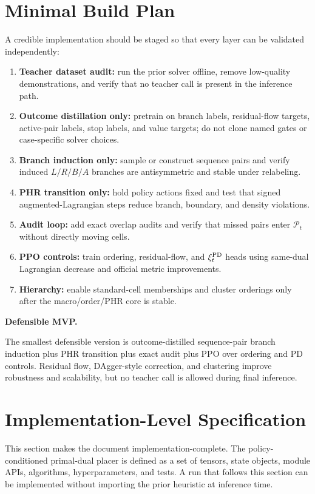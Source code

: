 \documentclass[11pt]{article}
\newcommand{\Pset}{\mathcal{P}}
\newcommand{\callout}[3]{%
\medskip\noindent\textbf{\textcolor{#1}{#2.}}\par\noindent #3\par\medskip
}
\begin{document}
\section{Minimal Build Plan}

A credible implementation should be staged so that every layer can be validated independently:
\begin{enumerate}
    \item \textbf{Teacher dataset audit:} run the prior solver offline, remove low-quality demonstrations, and verify that no teacher call is present in the inference path.
    \item \textbf{Outcome distillation only:} pretrain on branch labels, residual-flow targets, active-pair labels, stop labels, and value targets; do not clone named gates or case-specific solver choices.
    \item \textbf{Branch induction only:} sample or construct sequence pairs and verify induced $L/R/B/A$ branches are antisymmetric and stable under relabeling.
    \item \textbf{PHR transition only:} hold policy actions fixed and test that signed augmented-Lagrangian steps reduce branch, boundary, and density violations.
    \item \textbf{Audit loop:} add exact overlap audits and verify that missed pairs enter $\Pset_t$ without directly moving cells.
    \item \textbf{PPO controls:} train ordering, residual-flow, and $\xi_t^{\rm PD}$ heads using same-dual Lagrangian decrease and official metric improvements.
    \item \textbf{Hierarchy:} enable standard-cell memberships and cluster orderings only after the macro/order/PHR core is stable.
\end{enumerate}

\callout{green!70!black}{Defensible MVP}{The smallest defensible version is outcome-distilled sequence-pair branch induction plus PHR transition plus exact audit plus PPO over ordering and PD controls. Residual flow, DAgger-style correction, and clustering improve robustness and scalability, but no teacher call is allowed during final inference.}


\section{Implementation-Level Specification}

This section makes the document implementation-complete. The policy-conditioned primal-dual placer is defined as a set of tensors, state objects, module APIs, algorithms, hyperparameters, and tests. A run that follows this section can be implemented without importing the prior heuristic at inference time.
\end{document}
